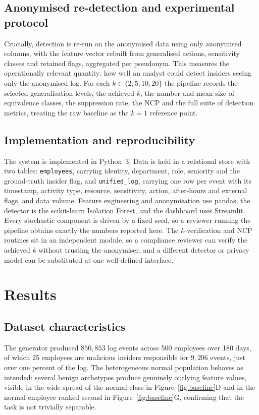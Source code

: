 \documentclass[10pt,a4paper]{article}
\begin{document}
\subsection{Anonymised re-detection and experimental protocol}
Crucially, detection is re-run on the anonymised data using only anonymised columns, with the feature vector rebuilt from generalised actions, sensitivity classes and retained flags, aggregated per pseudonym. This measures the operationally relevant quantity: how well an analyst could detect insiders seeing only the anonymised log. For each $k \in \{2,5,10,20\}$ the pipeline records the selected generalisation levels, the achieved $k$, the number and mean size of equivalence classes, the suppression rate, the NCP and the full suite of detection metrics, treating the raw baseline as the $k=1$ reference point.

\subsection{Implementation and reproducibility}
The system is implemented in Python~3. Data is held in a relational store with two tables: \texttt{employees}, carrying identity, department, role, seniority and the ground-truth insider flag, and \texttt{unified\_log}, carrying one row per event with its timestamp, activity type, resource, sensitivity, action, after-hours and external flags, and data volume. Feature engineering and anonymisation use pandas, the detector is the scikit-learn Isolation Forest, and the dashboard uses Streamlit. Every stochastic component is driven by a fixed seed, so a reviewer running the pipeline obtains exactly the numbers reported here. The $k$-verification and NCP routines sit in an independent module, so a compliance reviewer can verify the achieved $k$ without trusting the anonymiser, and a different detector or privacy model can be substituted at one well-defined interface.

\section{Results}
\label{sec:results}

\subsection{Dataset characteristics}
The generator produced $850{,}853$ log events across 500 employees over 180 days, of which 25 employees are malicious insiders responsible for $9{,}206$ events, just over one percent of the log. The heterogeneous normal population behaves as intended: several benign archetypes produce genuinely outlying feature values, visible in the wide spread of the normal class in Figure~\ref{fig:baseline}D and in the normal employee ranked second in Figure~\ref{fig:baseline}G, confirming that the task is not trivially separable.
\end{document}
